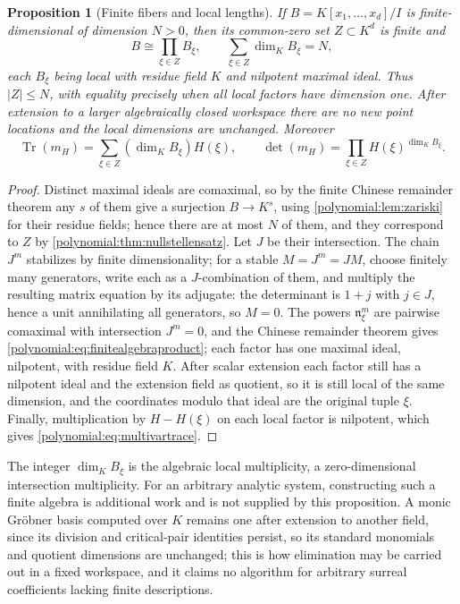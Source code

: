 \documentclass[11pt,letterpaper]{article}
\numberwithin{equation}{section}
\newtheorem{proposition}[theorem]{Proposition}
\theoremstyle{definition}
\theoremstyle{remark}\newtheorem{remark}[theorem]{Remark}
\newcommand{\Tr}{\operatorname{Tr}}
\begin{document}
\begin{proposition}[Finite fibers and local lengths]\label{polynomial:prop:finitealgebra}
If $B=K[x_1,\ldots,x_d]/I$ is finite-dimensional of dimension $N>0$, then its
common-zero set $Z\subset K^d$ is finite and
\begin{equation}\label{polynomial:eq:finitealgebraproduct}
 B\cong\prod_{\xi\in Z}B_\xi,\qquad \sum_{\xi\in Z}\dim_KB_\xi=N,
\end{equation}
each $B_\xi$ being local with residue field $K$ and nilpotent maximal ideal.
Thus $|Z|\le N$, with equality precisely when all local factors have dimension
one. After extension to a larger algebraically closed workspace there are no
new point locations and the local dimensions are unchanged. Moreover
\begin{equation}\label{polynomial:eq:multivartrace}
 \Tr(m_H)=\sum_{\xi\in Z}(\dim_KB_\xi)H(\xi),\qquad
 \det(m_H)=\prod_{\xi\in Z}H(\xi)^{\dim_KB_\xi}.
\end{equation}
\end{proposition}
\begin{proof}
Distinct maximal ideals are comaximal, so by the finite Chinese remainder
theorem any $s$ of them give a surjection $B\to K^s$, using
\cref{polynomial:lem:zariski} for their residue fields; hence there are at
most $N$ of them, and they correspond to $Z$ by
\cref{polynomial:thm:nullstellensatz}. Let $J$ be their intersection. The
chain $J^m$ stabilizes by finite dimensionality; for a stable
$M=J^m=JM$, choose finitely many generators, write each as a $J$-combination
of them, and multiply the resulting matrix equation by its adjugate: the
determinant is $1+j$ with $j\in J$, hence a unit annihilating all generators,
so $M=0$. The powers $\mathfrak n_\xi^m$ are pairwise comaximal with
intersection $J^m=0$, and the Chinese remainder theorem gives
\eqref{polynomial:eq:finitealgebraproduct}; each factor has one maximal ideal,
nilpotent, with residue field $K$. After scalar extension each factor still
has a nilpotent ideal and the extension field as quotient, so it is still
local of the same dimension, and the coordinates modulo that ideal are the
original tuple $\xi$. Finally, multiplication by $H-H(\xi)$ on each local
factor is nilpotent, which gives \eqref{polynomial:eq:multivartrace}.
\end{proof}

The integer $\dim_KB_\xi$ is the algebraic local multiplicity, a
zero-dimensional intersection multiplicity. For an arbitrary analytic system,
constructing such a finite algebra is additional work and is not supplied by
this proposition. A monic Gr\"obner basis computed over $K$ remains one after
extension to another field, since its division and critical-pair identities
persist, so its standard monomials and quotient dimensions are unchanged; this
is how elimination may be carried out in a fixed workspace, and it claims no
algorithm for arbitrary surreal coefficients lacking finite descriptions.
\end{document}

